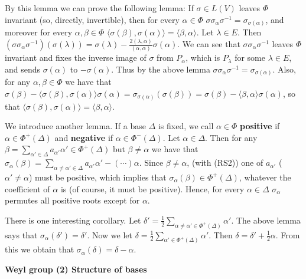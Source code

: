 \documentclass{article}
\begin{document}
By this lemma we can prove the following lemma: 
If $\sigma \in L(V)$ leaves $\Phi$ invariant (so, directly, invertible), then for every $\alpha \in \Phi$ $\sigma \sigma_\alpha \sigma^{-1} = \sigma_{\sigma(\alpha)}$, and moreover for every $\alpha, \beta \in \Phi$ $\langle \sigma(\beta), \sigma(\alpha) \rangle = \langle \beta, \alpha \rangle$.
Let $\lambda \in E$.
Then $(\sigma \sigma_\alpha \sigma^{-1})(\sigma(\lambda)) = \sigma(\lambda) - \frac{2(\lambda, \alpha)}{(\alpha, \alpha)} \sigma(\alpha)$.
We can see that $\sigma \sigma_\alpha \sigma^{-1}$ leaves $\Phi$ invariant and fixes the inverse image of $\sigma$ from $P_\alpha$, which is $P_\lambda$ for some $\lambda \in E$, and sends $\sigma(\alpha)$ to $-\sigma(\alpha)$.
Thus by the above lemma $\sigma \sigma_\alpha \sigma^{-1} = \sigma_{\sigma(\alpha)}$.
Also, for any $\alpha, \beta \in \Phi$ we have that $\sigma(\beta) - \langle \sigma(\beta), \sigma(\alpha) \rangle \sigma(\alpha) = \sigma_{\sigma(\alpha)} (\sigma(\beta)) = \sigma(\beta) - \langle \beta, \alpha \rangle \sigma(\alpha)$, so that $\langle \sigma(\beta), \sigma(\alpha) \rangle = \langle \beta, \alpha \rangle$.

We introduce another lemma.
If a base $\Delta$ is fixed, we call $\alpha \in \Phi$ \textbf{positive} if $\alpha \in \Phi^+(\Delta)$ and \textbf{negative} if $\alpha \in \Phi^-(\Delta)$.
Let $\alpha \in \Delta$.
Then for any $\beta = \sum_{\alpha' \in \Delta} a_{\alpha'} \alpha' \in \Phi^+(\Delta)$ but $\beta \ne \alpha$ we have that $\sigma_\alpha(\beta) = \sum_{\alpha \ne \alpha' \in \Delta} a_{\alpha'} \alpha' - (\cdots) \alpha$.
Since $\beta \ne \alpha$, (with (RS2)) one of $a_{\alpha'}$ ($\alpha' \ne \alpha$) must be positive, which implies that $\sigma_\alpha(\beta) \in \Phi^+(\Delta)$, whatever the coefficient of $\alpha$ is (of course, it must be positive).
Hence, for every $\alpha \in \Delta$ $\sigma_\alpha$ permutes all positive roots except for $\alpha$.

There is one interesting corollary.
Let $\delta' = \frac{1}{2} \sum_{\alpha \ne \alpha' \in \Phi^+(\Delta)} \alpha'$.
The above lemma says that $\sigma_\alpha(\delta') = \delta'$.
Now we let $\delta = \frac{1}{2} \sum_{\alpha' \in \Phi^+(\Delta)} \alpha'$.
Then $\delta = \delta' + \frac{1}{2} \alpha$.
From this we obtain that $\sigma_\alpha(\delta) = \delta - \alpha$.

\newpage

\textbf{Weyl group (2) Structure of bases}
\end{document}

